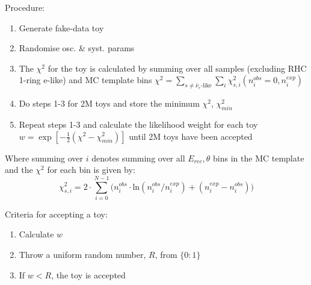 
Procedure: 
\begin{enumerate}
	\item Generate fake-data toy
	\item Randomise osc. \& syst. params
	\item The $\chi^2$ for the toy is calculated by summing over all samples (excluding RHC 1-ring e-like) and MC template bins $\chi^2 = \sum_{s \ne \bar{\nu}_e\textrm{-like}} \sum_{i} \chi^2_{s,i} \left( n^{obs}_{i} = 0, n^{exp}_{i} \right)$
	\item Do steps 1-3 for 2M toys and store the minimum $\chi^2$,  $\chi^2_{min}$
	\item Repeat steps 1-3 and calculate the likelihood weight for each toy $w = \exp{\left[-\frac{1}{2} \left( \chi^2 - \chi^2_{min} \right)\right]}$ until 2M toys have been accepted
\end{enumerate}

Where summing over $i$ denotes summing over all $E_{rec}, \theta$ bins in the MC template and the $\chi^2$ for each bin is given by:
\begin{equation} \label{eq:chisquare}
\chi^2_{s,i} = 
2 \cdot \sum_{i=0}^{N-1} 
\Big( 
n^{obs}_{i} \cdot \textrm{ln} (n^{obs}_{i}/n^{exp}_{i}) +
(n^{exp}_{i}-n^{obs}_{i}) 
\Big) 
\end{equation}

Criteria for accepting a toy:
\begin{enumerate}
	\item Calculate $w$
	\item Throw a uniform random number, $R$, from $\{0:1\}$
	\item If $w <R$, the toy is accepted
\end{enumerate}
